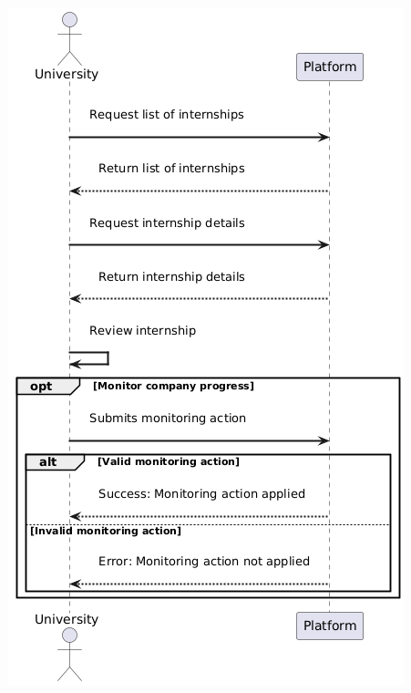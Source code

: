 \begin{center}
    \includegraphics[scale = 0.8]{Images/ImagesRASD/University_check_status.png}
\end{center}
\newpage

